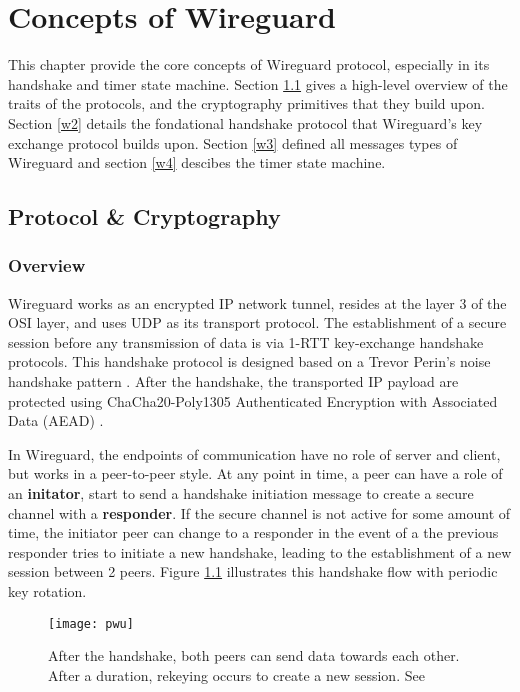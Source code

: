 \chapter{Concepts of Wireguard}
  This chapter provide the core concepts of Wireguard protocol, especially in its handshake
  and timer state machine. Section \ref{w1} gives a high-level overview of the traits of the
  protocols, and the cryptography primitives that they build upon. 
  Section \ref{w2}  details the fondational handshake protocol that Wireguard's
  key exchange protocol builds upon. Section \ref{w3} defined all messages types of Wireguard and
  section \ref{w4} descibes the timer state machine.
\section{Protocol \& Cryptography} \label{w1}
\subsection{Overview}
 Wireguard works as an encrypted IP network tunnel, resides at the layer 3 of the OSI layer, and
 uses UDP as its transport protocol. The establishment of a secure session before any 
 transmission of data is via 1-RTT key-exchange handshake protocols. This handshake protocol
 is designed based on a Trevor Perin's noise handshake pattern \cite{noise}. After the handshake, the  
 transported IP payload are protected using ChaCha20-Poly1305 Authenticated Encryption with 
 Associated Data (AEAD) \cite{rfc8439}.

 In Wireguard, the endpoints of communication have no role of server and client, but works in a
 peer-to-peer style. At any point in time, a peer can have a role of an \textbf{initator}, start to send 
 a handshake initiation message to create a secure channel with a \textbf{responder}. If the secure channel
 is not active for some amount of time, the initiator peer can change to a responder in the event of
 a the previous responder tries to initiate a new handshake, leading to the establishment of a new session
 between 2 peers. Figure \ref{fig:pwu_hs} illustrates this handshake flow with periodic key rotation.

\begin{figure}[h]
  \centering
  \texttt{[image: pwu]}
  \caption{After the handshake, both peers can send data towards each other. After a duration, rekeying occurs to create a new session. See \cite[p.~7]{pwu}}
  \label{fig:pwu_hs}
\end{figure}

